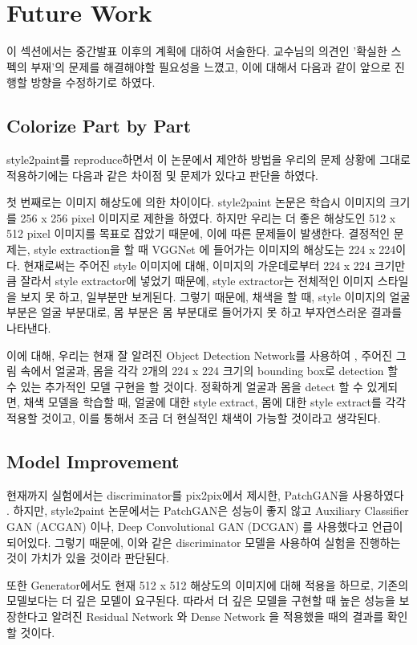 \section{Future Work}

이 섹션에서는 중간발표 이후의 계획에 대하여 서술한다.
교수님의 의견인 '확실한 스펙의 부재'의 문제를 해결해야할 필요성을 느꼈고, 이에 대해서 다음과 같이 앞으로 진행할 방향을 수정하기로 하였다.

\subsection{Colorize Part by Part}

style2paint를 reproduce하면서 이 논문에서 제안하 방법을 우리의 문제 상황에 그대로 적용하기에는 다음과 같은 차이점 및 문제가 있다고 판단을 하였다.

첫 번째로는 이미지 해상도에 의한 차이이다. style2paint 논문은 학습시 이미지의 크기를 256 x 256 pixel 이미지로 제한을 하였다.
하지만 우리는 더 좋은 해상도인 512 x 512 pixel 이미지를 목표로 잡았기 때문에, 이에 따른 문제들이 발생한다. 결정적인 문제는, style extraction을 할 때 VGGNet \cite{Simonyan2014}에 들어가는 이미지의 해상도는 224 x 224이다.
현재로써는 주어진 style 이미지에 대해, 이미지의 가운데로부터 224 x 224 크기만큼 잘라서 style extractor에 넣었기 때문에, style extractor는 전체적인 이미지 스타일을 보지 못 하고, 일부분만 보게된다. 그렇기 때문에, 채색을 할 때, style 이미지의 얼굴 부분은 얼굴 부분대로, 몸 부분은 몸 부분대로 들어가지 못 하고 부자연스러운 결과를 나타낸다.

이에 대해, 우리는 현재 잘 알려진 Object Detection Network를 사용하여 \cite{Ross2015, Ross2014,Kaiming2017, Joseph2016}, 주어진 그림 속에서 얼굴과, 몸을 각각 2개의 224 x 224 크기의 bounding box로 detection 할 수 있는 추가적인 모델 구현을 할 것이다. 정확하게 얼굴과 몸을 detect 할 수 있게되면, 채색 모델을 학습할 때, 얼굴에 대한 style extract, 몸에 대한 style extract를 각각 적용할 것이고, 이를 통해서 조금 더 현실적인 채색이 가능할 것이라고 생각된다.

\subsection{Model Improvement}

현재까지 실험에서는 discriminator를 pix2pix에서 제시한, PatchGAN을 사용하였다 \cite{phillip2017}.
하지만, style2paint 논문에서는 PatchGAN은 성능이 좋지 않고 Auxiliary Classifier GAN (ACGAN) \cite{Odena2017}이나, Deep Convolutional GAN (DCGAN) \cite{Radford2015}를 사용했다고 언급이 되어있다.
그렇기 때문에, 이와 같은 discriminator 모델을 사용하여 실험을 진행하는 것이 가치가 있을 것이라 판단된다.

또한 Generator에서도 현재 512 x 512 해상도의 이미지에 대해 적용을 하므로, 기존의 모델보다는 더 깊은 모델이 요구된다. 따라서 더 깊은 모델을 구현할 때 높은 성능을 보장한다고 알려진 Residual Network \cite{He2016ResNet}와 Dense Network \cite{Huang2017DenseNet}을 적용했을 때의 결과를 확인할 것이다.